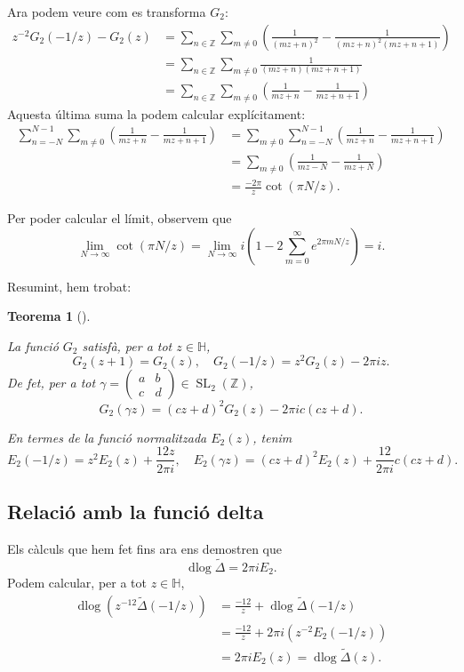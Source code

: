 \documentclass[
  letterpaper,
  DIV=11,
  numbers=noendperiod]{scrreprt}
\theoremstyle{plain}
\newtheorem{theorem}{Teorema}[chapter]
\theoremstyle{plain}
\theoremstyle{definition}
\theoremstyle{plain}
\theoremstyle{plain}
\theoremstyle{definition}
\theoremstyle{remark}
\begin{document}
Ara podem veure com es transforma \(G_2\): \begin{align*}
z^{-2}G_2(-1/z)-G_2(z)&= \sum_{n\in \mathbb{Z}}\sum_{m\neq 0}\left(\frac{1}{(mz+n)^2} - \frac{1}{(mz+n)^2(mz+n+1)}\right)\\
&= \sum_{n\in\mathbb{Z}}\sum_{m\neq 0} \frac{1}{(mz+n)(mz+n+1)}\\
&= \sum_{n\in\mathbb{Z}}\sum_{m\neq 0}\left(\frac{1}{mz+n}-\frac{1}{mz+n+1}\right)
\end{align*} Aquesta última suma la podem calcular explícitament:
\begin{align*}
\sum_{n=-N}^{N-1}\sum_{m\neq 0} \left(\frac{1}{mz+n}-\frac{1}{mz+n+1}\right) &=  \sum_{m\neq 0}\sum_{n=-N}^{N-1} \left(\frac{1}{mz+n}-\frac{1}{mz+n+1}\right)\\
&= \sum_{m\neq 0} \left(\frac{1}{mz-N}-\frac{1}{mz+N}\right) \\
&= \frac{-2\pi}{z}\cot(\pi N/z).
\end{align*}

Per poder calcular el límit, observem que \[
\lim_{N\longrightarrow\infty} \cot(\pi N/z) = \lim_{N\longrightarrow\infty} i(1-2\sum_{m=0}^\infty e^{2\pi mN/z}) = i.
\]

Resumint, hem trobat:

\begin{theorem}[]\protect\hypertarget{thm-transG2}{}\label{thm-transG2}

La funció \(G_2\) satisfà, per a tot \(z\in \mathbb{H}\), \[
G_2(z+1) = G_2(z),\quad G_2(-1/z) = z^2G_2(z) -2\pi i z.
\] De fet, per a tot
\(\gamma=\left(\begin{smallmatrix}a&b\\c&d\end{smallmatrix}\right)\in\operatorname{SL}_2(\mathbb{Z})\),
\[
G_2(\gamma z) = (cz+d)^2G_2(z) - 2\pi i c(cz+d).
\]

En termes de la funció normalitzada \(E_2(z)\), tenim \[
E_2(-1/z) = z^2E_2(z) +\frac{12 z}{2\pi i},\quad E_2(\gamma z) = (cz+d)^2E_2(z)+\frac{12}{2\pi i}c(cz+d).
\]

\end{theorem}

\subsection{Relació amb la funció
delta}\label{relaciuxf3-amb-la-funciuxf3-delta}

Els càlculs que hem fet fins ara ens demostren que \[
\operatorname{dlog}\tilde\Delta = 2\pi i E_2.
\] Podem calcular, per a tot \(z\in\mathbb{H}\), \begin{align*}
\operatorname{dlog}\left(z^{-12}\tilde\Delta(-1/z)\right) &= \frac{-12}{z} + \operatorname{dlog}\tilde\Delta(-1/z)\\
&= \frac{-12}{z} + 2\pi i(z^{-2}E_2(-1/z))\\
&= 2\pi i E_2(z)=\operatorname{dlog}\tilde\Delta(z).
\end{align*}
\end{document}
